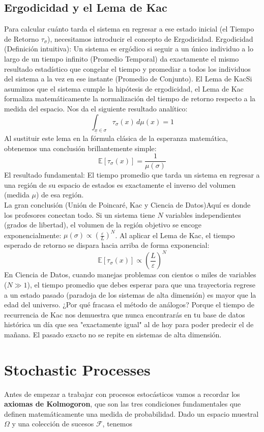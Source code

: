 \documentclass[10pt]{book}
\newcommand{\tbf}{\textbf}
\begin{document}
\section{Ergodicidad y el Lema de Kac}
Para calcular cuánto tarda el sistema en regresar a ese estado inicial (el Tiempo de Retorno $\tau_\sigma$), necesitamos introducir el concepto de Ergodicidad.  Ergodicidad (Definición intuitiva): Un sistema es ergódico si seguir a un único individuo a lo largo de un tiempo infinito (Promedio Temporal) da exactamente el mismo resultado estadístico que congelar el tiempo y promediar a todos los individuos del sistema a la vez en ese instante (Promedio de Conjunto).  El Lema de KacSi asumimos que el sistema cumple la hipótesis de ergodicidad, el Lema de Kac formaliza matemáticamente la normalización del tiempo de retorno respecto a la medida del espacio. Nos da el siguiente resultado analítico:
  $$\int_{\underline{x} \in \sigma} \tau_\sigma(x) \, d\mu(x) = 1$$Al sustituir este lema en la fórmula clásica de la esperanza matemática, obtenemos una conclusión brillantemente simple:
  $$\mathbb{E}[\tau_\sigma(x)] = \frac{1}{\mu(\sigma)}$$
El resultado fundamental: El tiempo promedio que tarda un sistema en regresar a una región de su espacio de estados es exactamente el inverso del volumen (medida $\mu$) de esa región. \\

\noindent
La gran conclusión (Unión de Poincaré, Kac y Ciencia de Datos)Aquí es donde los profesores conectan todo. Si un sistema tiene $N$ variables independientes (grados de libertad), el volumen de la región objetivo se encoge exponencialmente: $\mu(\sigma) \propto \left( \frac{\varepsilon}{L} \right)^N$.  Al aplicar el Lema de Kac, el tiempo esperado de retorno se dispara hacia arriba de forma exponencial:
  $$\mathbb{E}[\tau_\sigma(x)] \propto \left( \frac{L}{\varepsilon} \right)^N$$
En Ciencia de Datos, cuando manejas problemas con cientos o miles de variables ($N \gg 1$), el tiempo promedio que debes esperar para que una trayectoria regrese a un estado pasado (paradoja de los sistemas de alta dimensión) es mayor que la edad del universo.  ¿Por qué fracasa el método de análogos? Porque el tiempo de recurrencia de Kac nos demuestra que nunca encontrarás en tu base de datos histórica un día que sea "exactamente igual" al de hoy para poder predecir el de mañana. El pasado exacto no se repite en sistemas de alta dimensión.  


\chapter{Stochastic Processes}
\noindent
Antes de empezar a trabajar con procesos estocásticos vamos a recordar los \tbf{axiomas de Kolmogoron}, que son las tres condiciones fundamentales que definen matemáticamente una medida de probabilidad. Dado un espacio muestral $\Omega$ y una colección de sucesos $\mathcal{F}$, tenemos
\end{document}
